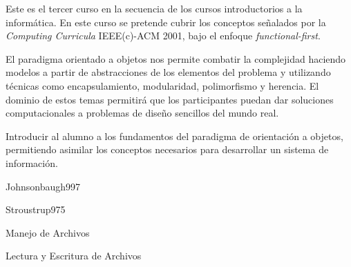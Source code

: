 \begin{syllabus}


\begin{justification}
Este es el tercer curso en la secuencia de los cursos introductorios a la informática. En este curso se pretende cubrir los conceptos señalados por la \textit{Computing Curricula} IEEE(c)-ACM 2001, bajo el enfoque \textit{functional-first}. 

El paradigma orientado a objetos nos permite combatir la
complejidad haciendo modelos a partir de abstracciones de los elementos del problema y utilizando técnicas como encapsulamiento,
modularidad, polimorfismo y herencia. El dominio de estos temas permitirá que los participantes puedan dar soluciones computacionales a problemas de diseño sencillos del mundo real.
\end{justification}

\begin{goals}
\item Introducir al alumno a los fundamentos del paradigma de orientación a objetos, permitiendo asimilar los conceptos necesarios para desarrollar un sistema de información.
\end{goals}

\begin{outcomes}
\end{outcomes}

\begin{unit}{\DSFIVEDef}{Johnsonbaugh99}{7}
\DSFIVEAllTopics
   \begin{unitgoals}
      \item \DSFIVEObjONE
      \item \DSFIVEObjTWO
      \item \DSFIVEObjTHREE
   \end{unitgoals}
\end{unit}

\begin{unit}{\PFONEDef}{Stroustrup97}{5}
   \begin{topics}
      \item \PFONETopicSintaxis
      \item \PFONETopicVariables
      \item \PFONETopicEstructuras
      \item \PFONETopicFunciones
      \item Manejo de Archivos
      \item Lectura y Escritura de Archivos
 \end{topics}


\end{unit}
\end{syllabus}
